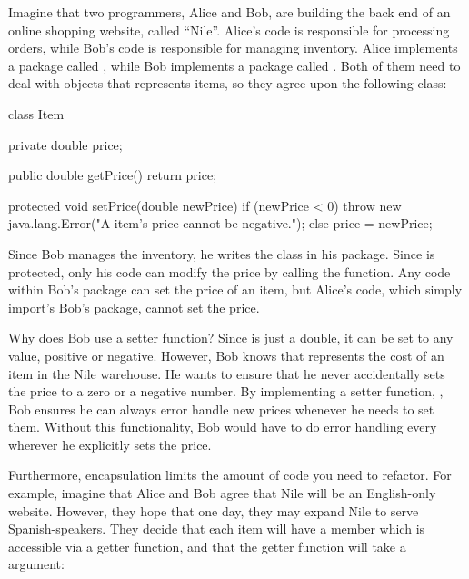 Imagine that two programmers, Alice and Bob, are building the back end of an online shopping website, called ``Nile''. Alice's code is responsible for processing orders, while Bob's code is responsible for managing inventory. Alice implements a package called , while Bob implements a package called . Both of them need to deal with objects that represents items, so they agree upon the following class:

\begin{code}
class Item {
  private double price;
  
  public double getPrice() {
    return price;
  }
  
  protected void setPrice(double newPrice) {
    if (newPrice < 0) {
      throw new java.lang.Error("A item's price cannot be negative.");
    } else {
      price = newPrice;
    }
  }
}
\end{code}

Since Bob manages the inventory, he writes the  class in his  package. Since  is protected, only his code can modify the price by calling the  function. Any code within Bob's package can set the price of an item, but Alice's code, which simply import's Bob's package, cannot set the price.

Why does Bob use a setter function? Since  is just a double, it can be set to any value, positive or negative. However, Bob knows that  represents the cost of an item in the Nile warehouse. He wants to ensure that he never accidentally sets the price to a zero or a negative number. By implementing a setter function, , Bob ensures he can always error handle new prices whenever he needs to set them. Without this functionality, Bob would have to do error handling every wherever he explicitly sets the price.


Furthermore, encapsulation limits the amount of code you need to refactor. For example, imagine that Alice and Bob agree that Nile will be an English-only website. However, they hope that one day, they may expand Nile to serve Spanish-speakers. They decide that each item will have a  member which is accessible via a getter function, and that the getter function will take a  argument:

